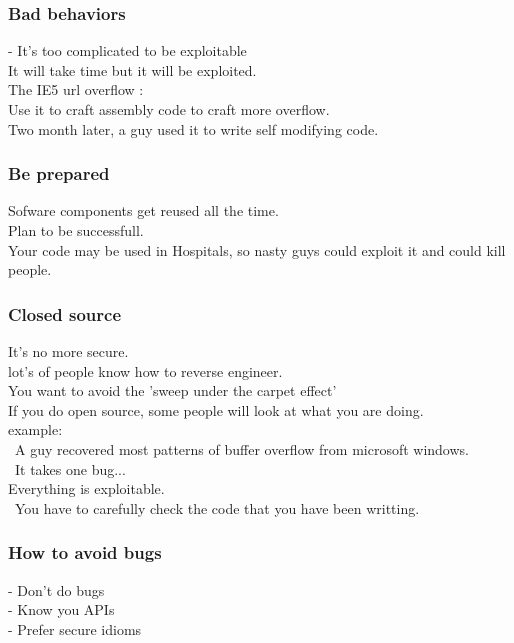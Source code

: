 \documentclass[a4paper,11pt]{article}
\begin{document}
\subsubsection{ Bad behaviors}
- It's too complicated to be exploitable\\
It will take time but it will be exploited.\\

The IE5 url overflow :\\
Use it to craft assembly code to craft more overflow.\\
Two month later, a guy used it to write self modifying code.\\


\subsubsection{ Be prepared}

Sofware components get reused all the time.\\
Plan to be successfull.\\

Your code may be used in Hospitals, so nasty guys could exploit it and could kill people.


\subsubsection{ Closed source}
It's no more secure.\\
lot's of people know how to reverse engineer.\\

You want to avoid the 'sweep under the carpet effect'\\

If you do open source, some people will look at what you are doing.\\

example:\\
\
A guy recovered most patterns of buffer overflow from microsoft windows.\\
\
It takes one bug...\\
Everything is exploitable.\\
\
You have to carefully check the code that you have been writting.\\


\subsubsection{ How to avoid bugs}
- Don't do bugs\\
- Know you APIs\\
- Prefer secure idioms\\
\end{document}
